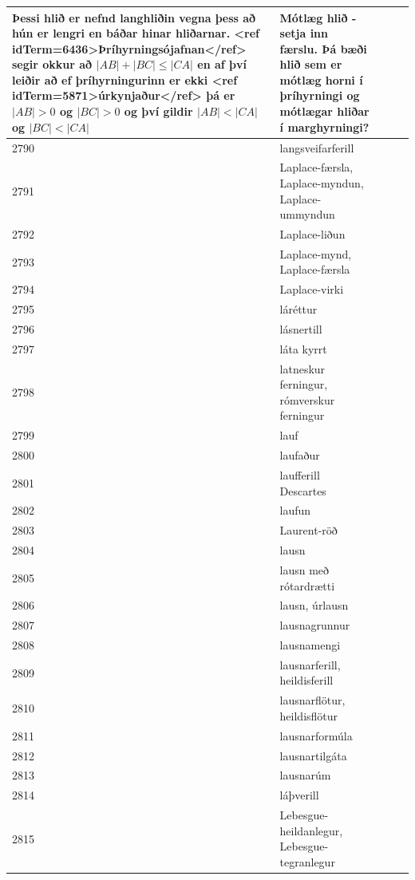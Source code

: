 \begin{longtable}{p{}|p{}|p{}|p{}|p{}}
Þessi hlið er nefnd langhliðin vegna þess að hún er lengri en báðar hinar hliðarnar. <ref idTerm=6436>Þríhyrningsójafnan</ref> segir okkur að $|AB| + |BC| \leq |CA|$ en af því leiðir að ef þríhyrningurinn er ekki <ref idTerm=5871>úrkynjaður</ref> þá er $|AB|>0$ og $|BC|>0$ og því gildir $|AB|<|CA|$ og $|BC|<|CA|$ & Mótlæg hlið - setja inn færslu. Þá bæði hlið sem er mótlæg horni í þríhyrningi og mótlægar hliðar í marghyrningi? \\
\hline
2790 & langsveifarferill &  &  &  \\
\hline
2791 & Laplace-færsla, Laplace-myndun, Laplace-ummyndun &  &  &  \\
\hline
2792 & Laplace-liðun &  &  &  \\
\hline
2793 & Laplace-mynd, Laplace-færsla &  &  &  \\
\hline
2794 & Laplace-virki &  &  &  \\
\hline
2795 & láréttur &  &  &  \\
\hline
2796 & lásnertill &  &  &  \\
\hline
2797 & láta kyrrt &  &  &  \\
\hline
2798 & latneskur ferningur, rómverskur ferningur &  &  &  \\
\hline
2799 & lauf &  &  &  \\
\hline
2800 & laufaður &  &  &  \\
\hline
2801 & laufferill Descartes &  &  &  \\
\hline
2802 & laufun &  &  &  \\
\hline
2803 & Laurent-röð &  &  &  \\
\hline
2804 & lausn &  &  &  \\
\hline
2805 & lausn með rótardrætti &  &  &  \\
\hline
2806 & lausn, úrlausn &  &  &  \\
\hline
2807 & lausnagrunnur &  &  &  \\
\hline
2808 & lausnamengi &  &  &  \\
\hline
2809 & lausnarferill, heildisferill &  &  &  \\
\hline
2810 & lausnarflötur, heildisflötur &  &  &  \\
\hline
2811 & lausnarformúla &  &  &  \\
\hline
2812 & lausnartilgáta &  &  &  \\
\hline
2813 & lausnarúm &  &  &  \\
\hline
2814 & láþverill &  &  &  \\
\hline
2815 & Lebesgue-heildanlegur, Lebesgue-tegranlegur &  &  &  \\

\end{longtable}

